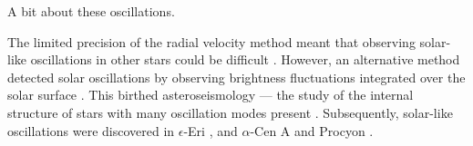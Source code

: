 




A bit about these oscillations.

The limited precision of the radial velocity method meant that observing solar-like oscillations in other stars could be difficult \citep{Christensen-Dalsgaard1982}. However, an alternative method detected solar oscillations by observing brightness fluctuations integrated over the solar surface \citep{Woodard.Hudson1983,Woodard.Hudson1983a}. This birthed asteroseismology --- the study of the internal structure of stars with many oscillation modes present \citep{Christensen-Dalsgaard1984}. Subsequently, solar-like oscillations were discovered in \(\epsilon\)-Eri \citep{Noyes.Baliunas.ea1984}, and \(\alpha\)-Cen A and Procyon \citep{Gelly.Grec.ea1986}.

